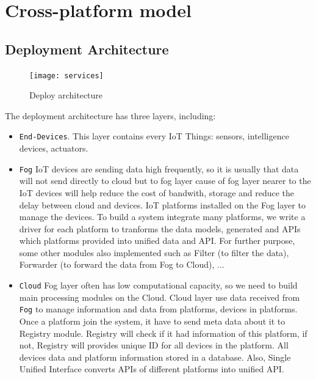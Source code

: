 \documentclass[runningheads,a4paper]{llncs}
\begin{document}
\newpage

\section{Cross-platform model}

\subsection{Deployment Architecture}

\begin{figure}[h]
\centering
\texttt{[image: services]} 
\caption{Deploy architecture}
\end{figure}


The deployment architecture has three layers, including:

\begin{itemize}

\item \texttt{End-Devices}. This layer contains every IoT Things: sensors, intelligence devices, actuators.

\item \texttt{Fog} IoT devices are sending data high frequently, so it is usually that data will not send directly to cloud but to fog layer cause of fog layer nearer to the IoT devices will help reduce the cost of bandwith, storage and reduce the delay between cloud and devices. IoT platforms installed on the Fog layer to manage the devices. To build a system integrate many platforms, we write a driver for each platform to tranforms the data models, generated and APIs which platforms provided into unified data and API. For further purpose, some other modules also implemented such as Filter (to filter the data), Forwarder (to forward the data from Fog to Cloud), ... 

\item \texttt{Cloud} Fog layer often has low computational capacity, so we need to build main 
processing modules on the Cloud. Cloud layer use data received from \texttt{Fog} to manage information and data from platforms, devices in platforms. Once a platform join the system, it have to send meta data about it to Registry module. Registry will check if it had information of this platform, if not, Registry will provides unique ID for all devices in the platform. All devices data and platform information stored in a database. Also, Single Unified Interface converts APIs of different platforms into unified API.

\end{itemize}
\end{document}
